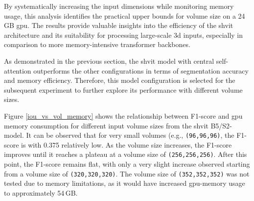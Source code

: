 \medskip

By systematically increasing the input dimensions while monitoring memory usage, this analysis identifies the practical upper bounds for volume size on a 24\,GB \acrshort{gpu}. The results provide valuable insights into the efficiency of the \gls{shvit} architecture and its suitability for processing large-scale \gls{3d} inputs, especially in comparison to more memory-intensive transformer backbones.

\medskip

As demonstrated in the previous section, the \gls{shvit} model with central self-attention outperforms the other configurations in terms of segmentation accuracy and memory efficiency. Therefore, this model configuration is selected for the subsequent experiment to further explore its performance with different volume sizes.

\medskip

Figure \ref{iou_vs_vol_memory} shows the relationship between F1-score and \acrshort{gpu} memory consumption for different input volume sizes from the \gls{shvit} B5/S2-model. It can be observed that for very small volumes (e.g., {\tt (96,96,96)}, the F1-score is with 0.375 relatively low. As the volume size increases, the F1-score improves until it reaches a plateau at a volume size of {\tt (256,256,256)}. After this point, the F1-score remains flat, with only a very slight increase observed starting from a volume size of {\tt (320,320,320)}. The volume size of {\tt (352,352,352)} was not tested due to memory limitations, as it would have increased \gls{gpu}-memory usage to approximately 54\,GB.

\medskip

